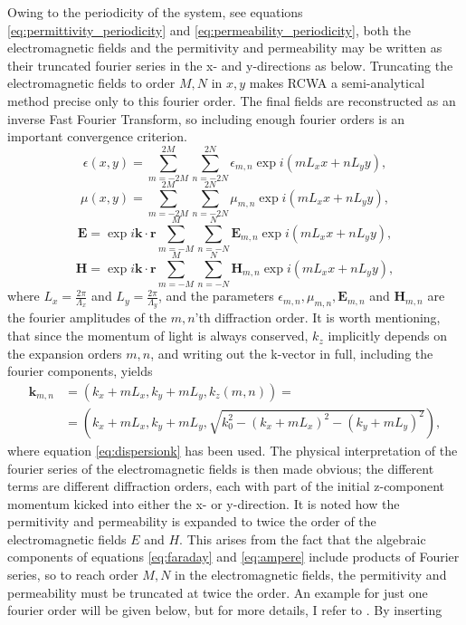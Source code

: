 Owing to the periodicity of the system, see equations \ref{eq:permittivity_periodicity} and  \ref{eq:permeability_periodicity}, both the electromagnetic fields and the permitivity and permeability may
be written as their truncated fourier series in the x- and y-directions as below. Truncating the electromagnetic fields to order $M,N$ in $x,y$ makes RCWA a semi-analytical method
precise only to this fourier order. The final fields are reconstructed as an inverse Fast Fourier Transform, so including enough fourier orders is an important convergence criterion.
\begin{equation}
\label{eq:fourierPermitivity}
\epsilon(x,y) = \sum_{m=-2M}^{2M}\sum_{n=-2N}^{2N}\epsilon_{m,n}\exp{i(mL_xx+nL_yy)},
\end{equation}
\begin{equation}
\label{eq:fourierPermeability}
\mu(x,y) = \sum_{m=-2M}^{2M}\sum_{n=-2N}^{2N}\mu_{m,n}\exp{i(mL_xx+nL_yy)},
\end{equation}
\begin{equation}
\label{eq:fourierFaraday}
\mathbf{E} = \exp{i\mathbf{k}\cdot\mathbf{r}}\sum_{m=-M}^{M}\sum_{n=-N}^{N}\mathbf{E}_{m,n}\exp{i(mL_xx+nL_yy)},
\end{equation}
\begin{equation}
\label{eq:fourierAmpere}
\mathbf{H} = \exp{i\mathbf{k}\cdot\mathbf{r}}\sum_{m=-M}^{M}\sum_{n=-N}^{N}\mathbf{H}_{m,n}\exp{i(mL_xx+nL_yy)},
\end{equation}
where $L_x = \frac{2\pi}{\Lambda_x}$ and $L_y = \frac{2\pi}{\Lambda_y}$, 
and the parameters $\epsilon_{m,n}, \mu_{m,n}, \mathbf{E}_{m,n}$ and $\mathbf{H}_{m,n}$ are the fourier amplitudes of the $m,n$'th diffraction order.
It is worth mentioning, that since the momentum of light is always conserved, $k_z$ implicitly depends on the expansion orders $m,n$, and writing out the k-vector in full, including the fourier components, yields
\begin{align}
\label{eq:kmn}
\mathbf{k}_{m,n} &= (k_x+mL_x,k_y+mL_y,k_z(m,n)) = \\ &= \left(k_x+mL_x,k_y+mL_y,\sqrt{k_0^2-(k_x+mL_x)^2-(k_y+mL_y)^2}\right),
\end{align}
where equation \ref{eq:dispersionk} has been used. The physical interpretation of the fourier series of the electromagnetic fields is then made obvious;
the different terms are different diffraction orders, each with part of the initial z-component momentum kicked into either the x- or y-direction.
It is noted how the permitivity and permeability is expanded to twice the order of the electromagnetic fields $E$ and $H$. This arises
from the fact that the algebraic components of equations \ref{eq:faraday} and \ref{eq:ampere} include products of Fourier series, so to reach order $M,N$ in the electromagnetic fields,
the permitivity and permeability must be truncated at twice the order. An example for just one fourier order will be given below, but for more details, I refer to \cite{fmm}.
By inserting 



